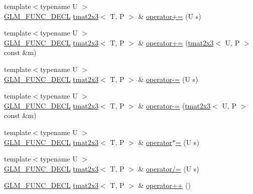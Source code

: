 \begin{DoxyCompactItemize}
\item 
{\footnotesize template$<$typename U $>$ }\\\hyperlink{setup_8hpp_ab2d052de21a70539923e9bcbf6e83a51}{G\+L\+M\+\_\+\+F\+U\+N\+C\+\_\+\+D\+E\+CL} \hyperlink{structglm_1_1detail_1_1tmat2x3}{tmat2x3}$<$ T, P $>$ \& \hyperlink{structglm_1_1detail_1_1tmat2x3_ae08c795a556293db526b65227c559f43}{operator+=} (U s)
\item 
{\footnotesize template$<$typename U $>$ }\\\hyperlink{setup_8hpp_ab2d052de21a70539923e9bcbf6e83a51}{G\+L\+M\+\_\+\+F\+U\+N\+C\+\_\+\+D\+E\+CL} \hyperlink{structglm_1_1detail_1_1tmat2x3}{tmat2x3}$<$ T, P $>$ \& \hyperlink{structglm_1_1detail_1_1tmat2x3_a1e667eb8ffefc6bb508032e842349bfa}{operator+=} (\hyperlink{structglm_1_1detail_1_1tmat2x3}{tmat2x3}$<$ U, P $>$ const \&m)
\item 
{\footnotesize template$<$typename U $>$ }\\\hyperlink{setup_8hpp_ab2d052de21a70539923e9bcbf6e83a51}{G\+L\+M\+\_\+\+F\+U\+N\+C\+\_\+\+D\+E\+CL} \hyperlink{structglm_1_1detail_1_1tmat2x3}{tmat2x3}$<$ T, P $>$ \& \hyperlink{structglm_1_1detail_1_1tmat2x3_a3c7e03eba709ac58d92499de92386ffa}{operator-\/=} (U s)
\item 
{\footnotesize template$<$typename U $>$ }\\\hyperlink{setup_8hpp_ab2d052de21a70539923e9bcbf6e83a51}{G\+L\+M\+\_\+\+F\+U\+N\+C\+\_\+\+D\+E\+CL} \hyperlink{structglm_1_1detail_1_1tmat2x3}{tmat2x3}$<$ T, P $>$ \& \hyperlink{structglm_1_1detail_1_1tmat2x3_a5544985401df4e7457e9aa7925ad0ca5}{operator-\/=} (\hyperlink{structglm_1_1detail_1_1tmat2x3}{tmat2x3}$<$ U, P $>$ const \&m)
\item 
{\footnotesize template$<$typename U $>$ }\\\hyperlink{setup_8hpp_ab2d052de21a70539923e9bcbf6e83a51}{G\+L\+M\+\_\+\+F\+U\+N\+C\+\_\+\+D\+E\+CL} \hyperlink{structglm_1_1detail_1_1tmat2x3}{tmat2x3}$<$ T, P $>$ \& \hyperlink{structglm_1_1detail_1_1tmat2x3_aa37d03f6278f001ac2ece38115148bdd}{operator$\ast$=} (U s)
\item 
{\footnotesize template$<$typename U $>$ }\\\hyperlink{setup_8hpp_ab2d052de21a70539923e9bcbf6e83a51}{G\+L\+M\+\_\+\+F\+U\+N\+C\+\_\+\+D\+E\+CL} \hyperlink{structglm_1_1detail_1_1tmat2x3}{tmat2x3}$<$ T, P $>$ \& \hyperlink{structglm_1_1detail_1_1tmat2x3_a3687e511d47d156bb7546102d28fa2f7}{operator/=} (U s)
\item 
\hyperlink{setup_8hpp_ab2d052de21a70539923e9bcbf6e83a51}{G\+L\+M\+\_\+\+F\+U\+N\+C\+\_\+\+D\+E\+CL} \hyperlink{structglm_1_1detail_1_1tmat2x3}{tmat2x3}$<$ T, P $>$ \& \hyperlink{structglm_1_1detail_1_1tmat2x3_a633e1c5afab2a44f0692e5c71fbba424}{operator++} ()

\end{DoxyCompactItemize}
